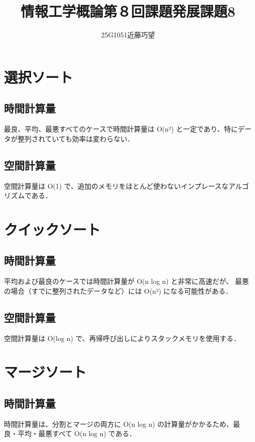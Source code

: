 \documentclass[uplatex]{jsarticle}
\begin{document}
\title{情報工学概論第８回課題発展課題8}
\author{25G1051近藤巧望}
\maketitle

\section{選択ソート}
\subsection{時間計算量}

最良、平均、最悪すべてのケースで時間計算量は O(n²) と一定であり、特にデータが整列されていても効率は変わらない．
\subsection{空間計算量}

空間計算量は O(1) で、追加のメモリをほとんど使わないインプレースなアルゴリズムである．

\section{クイックソート}
\subsection{時間計算量}

平均および最良のケースでは時間計算量が O(n log n) と非常に高速だが、
最悪の場合（すでに整列されたデータなど）には O(n²) になる可能性がある．

\subsection{空間計算量}

空間計算量は O(log n) で、再帰呼び出しによりスタックメモリを使用する．

\section{マージソート}
\subsection{時間計算量}

時間計算量は、分割とマージの両方に O(n log n) の計算量がかかるため、最良・平均・最悪すべて O(n log n) である．
\end{document}

